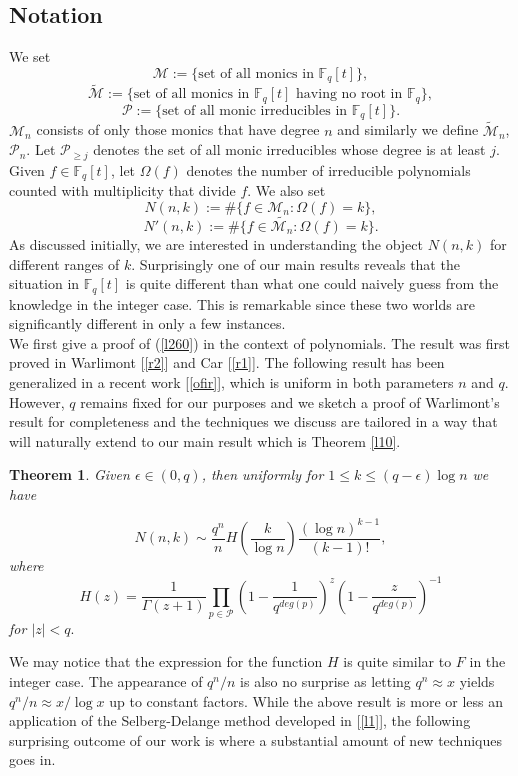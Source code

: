 \documentclass[12pt]{amsart}
\numberwithin{equation}{section}
\newtheorem{theorem}{Theorem}[section]
\theoremstyle{remark}
\theoremstyle{remark}
\theoremstyle{definition}
\begin{document}
\subsection{Notation}\label{lc} We set
$$\mathcal{M}:=\bigg\{ \text{set of all monics in } \mathbb{F}_q[t] \bigg \},$$
$$\widetilde{\mathcal{M}}:=\bigg\{ \text{set of all monics in } \mathbb{F}_q[t] \text{ having no root in }\mathbb{F}_q\bigg \},$$
$$\mathcal{P}:=\bigg\{ \text{set of all monic irreducibles in } \mathbb{F}_q[t] \bigg \}.$$
$\mathcal{M}_n$ consists of only those monics that have degree $n$ and similarly we define $\widetilde{\mathcal{M}}_n$, $\mathcal{P}_n$. Let $\mathcal{P}_{\geqslant j}$ denotes the set of all monic irreducibles whose degree is at least $j.$\\
Given $f\in\mathbb{F}_q[t]$, let $\Omega(f)$ denotes the number of irreducible polynomials counted with multiplicity that divide $f$. We also set
$$N(n,k):= \#\bigg \{f\in\mathcal{M}_n:\Omega(f)=k \bigg \},$$
$$N'(n,k):= \#\bigg \{f\in \widetilde{\mathcal{M}_n}:\Omega(f)=k \bigg \}.$$
As discussed initially, we are interested in understanding the object $N(n,k)$ for different ranges of $k$. Surprisingly one of our main results reveals that the situation in $\mathbb{F}_q[t]$ is quite different than what one could naively guess from the knowledge in the integer case. This is remarkable since these two worlds are significantly different in only a few instances.\\
We first give a proof of (\ref{l260}) in the context of polynomials. The result was first proved in Warlimont [\ref{r2}] and Car [\ref{r1}]. The following result has been generalized in a recent work [\ref{ofir}], which is uniform in both parameters $n$ and $q$. However, $q$ remains fixed for our purposes and we sketch a proof of Warlimont's result for completeness and the techniques we discuss are tailored in a way that will naturally extend to our main result which is Theorem \ref{l10}.\\
\begin{theorem}\label{l6}
Given $\epsilon\in(0,q)$, then uniformly for $1\leqslant k\leqslant (q-\epsilon)\log n$ we have
   
   $$N(n,k)\sim \dfrac{q^n}{n}H\left( \dfrac{k}{\log n} \right)\dfrac{{(\log n)}^{k-1}}{(k-1)!},$$
where \[H(z)=\dfrac{1}{\Gamma(z+1)} \displaystyle\prod\limits_{p\in\mathcal{P}} \left(1-\dfrac{1}{q^{deg(p)}} \right)^z\left(1-\dfrac{z}{{q^{deg(p)}}} \right)^{-1}\] for $|z|<q.$
\end{theorem}
We may notice that the expression for the function $H$ is quite similar to $F$ in the integer case. The appearance of $q^n/n$ is also no surprise as letting $q^n\approx x$ yields $q^n/n \approx x/\log x$ up to constant factors. While the above result is more or less an application of the Selberg-Delange method developed in [\ref{l1}], the following surprising outcome of our work is where a substantial amount of new techniques goes in.\\
\end{document}
